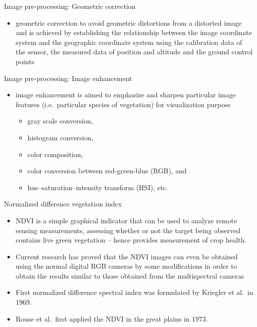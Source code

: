 \documentclass[11pt,dvipsnames,ignorenonframetext,aspectratio=169]{beamer}
\providecommand{\tightlist}{%
  \setlength{\itemsep}{0pt}\setlength{\parskip}{0pt}}
\begin{document}
\begin{frame}{Image pre-processing: Geometric correction}
\protect\hypertarget{image-pre-processing-geometric-correction}{}
\begin{itemize}
\tightlist
\item
  geometric correction to avoid geometric distortions from a distorted
  image and is achieved by establishing the relationship between the
  image coordinate system and the geographic coordinate system using the
  calibration data of the sensor, the measured data of position and
  altitude and the ground control points
\end{itemize}
\end{frame}

\begin{frame}{Image pre-processing: Image enhancement}
\protect\hypertarget{image-pre-processing-image-enhancement}{}
\begin{itemize}
\tightlist
\item
  image enhancement is aimed to emphasize and sharpen particular image
  features (i.e.~particular species of vegetation) for visualization
  purpose

  \begin{itemize}
  \tightlist
  \item
    gray scale conversion,
  \item
    histogram conversion,
  \item
    color composition,
  \item
    color conversion between red-green-blue (RGB), and
  \item
    hue--saturation--intensity transform (HSI), etc.
  \end{itemize}
\end{itemize}
\end{frame}

\begin{frame}{Normalized difference vegetation index}
\protect\hypertarget{normalized-difference-vegetation-index}{}
\begin{itemize}
\tightlist
\item
  NDVI is a simple graphical indicator that can be used to analyze
  remote sensing measurements, assessing whether or not the target being
  observed contains live green vegetation -- hence provides measurement
  of crop health.
\item
  Current research has proved that the NDVI images can even be obtained
  using the normal digital RGB cameras by some modifications in order to
  obtain the results similar to those obtained from the multispectral
  cameras
\item
  First normalized difference spectral index was formulated by Kriegler
  et al.~in 1969.
\item
  Rouse et al.~first applied the NDVI in the great plains in 1973.
\end{itemize}
\end{frame}
\end{document}
